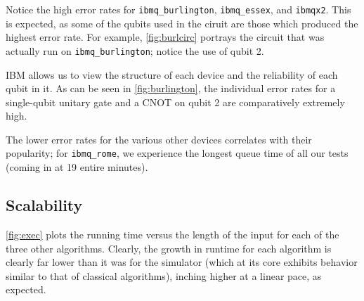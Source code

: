 \documentclass[12pt]{article}
\begin{document}

Notice the high error rates for \texttt{ibmq\_burlington}, \texttt{ibmq\_essex}, and \texttt{ibmqx2}.
This is expected, as some of the qubits used in the ciruit are those which produced the highest error rate.
For example, \autoref{fig:burlcirc} portrays the circuit that was actually run on \texttt{ibmq\_burlington}; notice the use of qubit 2.

IBM allows us to view the structure of each device and the reliability of each qubit in it.
As can be seen in \autoref{fig:burlington}, the individual error rates for a single-qubit unitary gate and a CNOT on qubit 2 are comparatively extremely high.

The lower error rates for the various other devices correlates with their popularity; for \texttt{ibmq\_rome}, we experience the longest queue time of all our tests (coming in at 19 entire minutes).

\subsection{Scalability}\label{section:scale}

\autoref{fig:exec} plots the running time versus the length of the input for each of the three other algorithms.
Clearly, the growth in runtime for each algorithm is clearly far lower than it was for the simulator (which at its core exhibits behavior similar to that of classical algorithms), inching higher at a linear pace, as expected.
\end{document}
